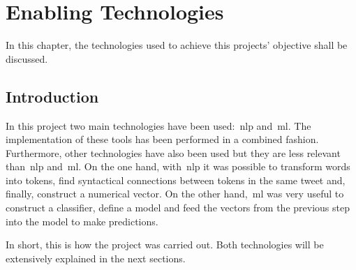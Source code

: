 \chapter{Enabling Technologies}
\label{chap:entech}


In this chapter, the technologies used to achieve this projects' objective shall be discussed.

\section{Introduction}\par
In this project two main technologies have been used:~\acf{nlp}  and~\acf{ml}. The implementation of these tools has been performed in a combined fashion. Furthermore, other technologies have also been used but they are less relevant than~\ac{nlp} and~\ac{ml}.
On the one hand, with~\ac{nlp} it was possible to transform words into tokens, find syntactical connections between tokens in the same tweet and, finally, construct a numerical vector. On the other hand,~\ac{ml} was very useful to construct a classifier, define a model and feed the vectors from the previous step into the model to make predictions.\par
In short, this is how the project was carried out. Both technologies will be extensively explained in the next sections.

